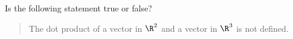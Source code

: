 \documentclass{ximera}
\author{Gregory Hartman \and Matthew Carr}
\begin{document}
\begin{exercise}
Is the following statement true or false?
\begin{quote}
The dot product of a vector in $\R^2$ and a vector in
$\R^3$ is not defined.
\end{quote}

\begin{multipleChoice}
\end{multipleChoice}

\end{exercise}
\end{document}
